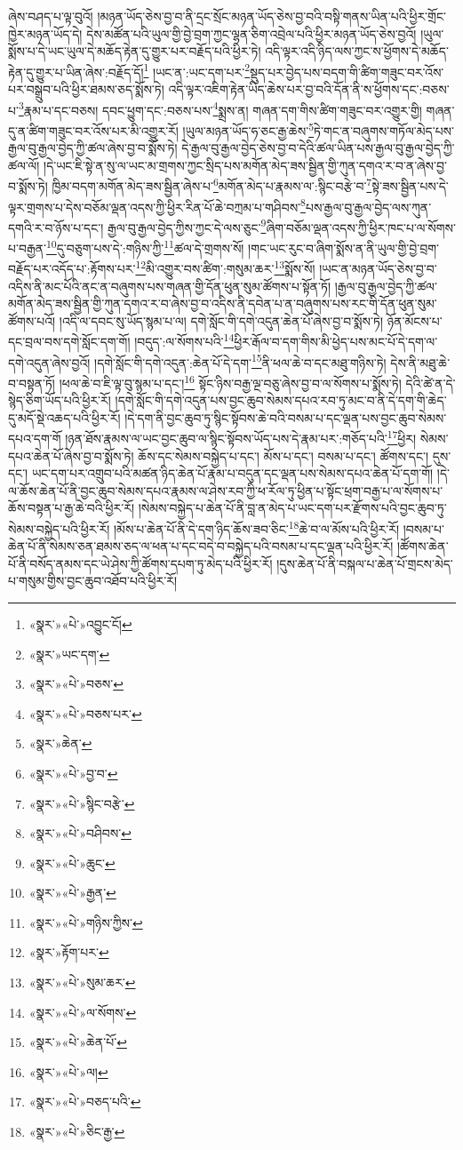ཞེས་བཤད་པ་ལྟ་བུའོ། །མཉན་ཡོད་ཅེས་བྱ་བ་ནི་དྲང་སྲོང་མཉན་ཡོད་ཅེས་བྱ་བའི་བསྟི་གནས་ཡིན་པའི་ཕྱིར་གྲོང་ཁྱེར་མཉན་ཡོད་དེ། དེས་མཚོན་པའི་ཡུལ་གྱི་བྱེ་བྲག་ཀྱང་ལྷན་ཅིག་འབྲེལ་པའི་ཕྱིར་མཉན་ཡོད་ཅེས་བྱའོ། །ཡུལ་སྨོས་པ་དེ་ཡང་ཡུལ་དེ་མཆོད་རྟེན་དུ་གྱུར་པར་བརྗོད་པའི་ཕྱིར་ཏེ། འདི་ལྟར་འདི་ཉིད་ལས་ཀྱང་ས་ཕྱོགས་དེ་མཆོད་རྟེན་དུ་གྱུར་པ་ཡིན་ཞེས་:བརྗོད་དོ།\footnote{«སྣར་»«པེ་»འབྱུང་ངོ།} །ཡང་ན་:ཡང་དག་པར་\footnote{«སྣར་»ཡང་དག་}སྡུད་པར་བྱེད་པས་བདག་གི་ཚིག་གཟུང་བར་འོས་པར་བསྒྲུབ་པའི་ཕྱིར་ཐམས་ཅད་སྨོས་ཏེ། འདི་ལྟར་འཇིག་རྟེན་ཡིད་ཆེས་པར་བྱ་བའི་དོན་ནི་ས་ཕྱོགས་དང་:བཅས་པ་\footnote{«སྣར་»«པེ་»བཅས་}རྣམ་པ་དང་བཅས། དབང་ཕྱུག་དང་:བཅས་པས་\footnote{«སྣར་»«པེ་»བཅས་པར་}སྨྲས་ན། གཞན་དག་གིས་ཚིག་གཟུང་བར་འགྱུར་གྱི། གཞན་དུ་ན་ཚིག་གཟུང་བར་འོས་པར་མི་འགྱུར་རོ། །ཡུལ་མཉན་ཡོད་ཧ་ཅང་རྒྱ་ཆེས་\footnote{«སྣར་»ཆེན་}ཏེ་གང་ན་བཞུགས་གཏོལ་མེད་པས་རྒྱལ་བུ་རྒྱལ་བྱེད་ཀྱི་ཚལ་ཞེས་བྱ་བ་སྨོས་ཏེ། དེ་རྒྱལ་བུ་རྒྱལ་བྱེད་ཅེས་བྱ་བ་དེའི་ཚལ་ཡིན་པས་རྒྱལ་བུ་རྒྱལ་བྱེད་ཀྱི་ཚལ་ལོ། །དེ་ཡང་ཇི་སྟེ་ན་སུ་ལ་ཡང་མ་གྲགས་ཀྱང་སྲིད་པས་མགོན་མེད་ཟས་སྦྱིན་གྱི་ཀུན་དགའ་ར་བ་ན་ཞེས་བྱ་བ་སྨོས་ཏེ། ཁྱིམ་བདག་མགོན་མེད་ཟས་སྦྱིན་ཞེས་པ་\footnote{«སྣར་»«པེ་»བྱ་བ་}མགོན་མེད་པ་རྣམས་ལ་:སྙིང་བརྩེ་བ་\footnote{«སྣར་»«པེ་»སྙིང་བརྩེ་}སྟེ་ཟས་སྦྱིན་པས་དེ་ལྟར་གྲགས་པ་དེས་བཅོམ་ལྡན་འདས་ཀྱི་ཕྱིར་རིན་པོ་ཆེ་བཀྲམ་པ་གཤིབས་\footnote{«སྣར་»«པེ་»བཤིབས་}པས་རྒྱལ་བུ་རྒྱལ་བྱེད་ལས་ཀུན་དགའི་ར་བ་ཉོས་པ་དང་། རྒྱལ་བུ་རྒྱལ་བྱེད་ཀྱིས་ཀྱང་དེ་ལས་ཅུང་\footnote{«སྣར་»«པེ་»ཆུང་}ཞིག་བཅོམ་ལྡན་འདས་ཀྱི་ཕྱིར་ཁང་པ་ལ་སོགས་པ་བརྒྱན་\footnote{«སྣར་»«པེ་»རྒྱན་}དུ་བཅུག་པས་དེ་:གཉིས་ཀྱི་\footnote{«སྣར་»«པེ་»གཉིས་ཀྱིས་}ཚལ་དེ་གྲགས་སོ། །གང་ཡང་རུང་བ་ཞིག་སྨོས་ན་ནི་ཡུལ་གྱི་བྱེ་བྲག་བརྗོད་པར་འདོད་པ་:རྟོགས་པར་\footnote{«སྣར་»རྟོག་པར་}མི་འགྱུར་བས་ཚིག་:གསུམ་ཆར་\footnote{«སྣར་»«པེ་»སུམ་ཆར་}སྨོས་སོ། །ཡང་ན་མཉན་ཡོད་ཅེས་བྱ་བ་འདིས་ནི་མང་པོའི་ནང་ན་བཞུགས་པས་གཞན་གྱི་དོན་ཕུན་སུམ་ཚོགས་པ་སྟོན་ཏོ། །རྒྱལ་བུ་རྒྱལ་བྱེད་ཀྱི་ཚལ་མགོན་མེད་ཟས་སྦྱིན་གྱི་ཀུན་དགའ་ར་བ་ཞེས་བྱ་བ་འདིས་ནི་དབེན་པ་ན་བཞུགས་པས་རང་གི་དོན་ཕུན་སུམ་ཚོགས་པའོ། །འདི་ལ་དབང་སུ་ཡོད་སྙམ་པ་ལ། དགེ་སློང་གི་དགེ་འདུན་ཆེན་པོ་ཞེས་བྱ་བ་སྨོས་ཏེ། ཉོན་མོངས་པ་དང་བྲལ་བས་དགེ་སློང་དག་གོ། །བདུད་:ལ་སོགས་པའི་\footnote{«སྣར་»«པེ་»ལ་སོགས་}ཕྱིར་རྒོལ་བ་དག་གིས་མི་ཕྱེད་པས་མང་པོ་དེ་དག་ལ་དགེ་འདུན་ཞེས་བྱའོ། །དགེ་སློང་གི་དགེ་འདུན་:ཆེན་པོ་དེ་དག་\footnote{«སྣར་»«པེ་»ཆེན་པོ་}ནི་ཕལ་ཆེ་བ་དང་མཐུ་གཉིས་ཏེ། དེས་ནི་མཐུ་ཆེ་བ་བསྟན་ཏོ། །ཕལ་ཆེ་བ་ཇི་ལྟ་བུ་སྙམ་པ་དང་།\footnote{«སྣར་»«པེ་»ལ།} སྟོང་ཉིས་བརྒྱ་ལྔ་བཅུ་ཞེས་བྱ་བ་ལ་སོགས་པ་སྨོས་ཏེ། དེའི་ཚེ་ན་དེ་སྙེད་ཅིག་ཡོད་པའི་ཕྱིར་རོ། །དགེ་སློང་གི་དགེ་འདུན་པས་བྱང་ཆུབ་སེམས་དཔའ་རབ་ཏུ་མང་བ་ནི་དེ་དག་གི་ཆེད་དུ་མདོ་སྡེ་འཆད་པའི་ཕྱིར་རོ། །དེ་དག་ནི་བྱང་ཆུབ་ཏུ་སྙིང་སྟོབས་ཆེ་བའི་བསམ་པ་དང་ལྡན་པས་བྱང་ཆུབ་སེམས་དཔའ་དག་གོ །ཉན་ཐོས་རྣམས་ལ་ཡང་བྱང་ཆུབ་ལ་སྙིང་སྟོབས་ཡོད་པས་དེ་རྣམ་པར་:གཅོད་པའི་\footnote{«སྣར་»«པེ་»བཅད་པའི་}ཕྱིར། སེམས་དཔའ་ཆེན་པོ་ཞེས་བྱ་བ་སྨོས་ཏེ། ཆོས་དང་སེམས་བསྐྱེད་པ་དང་། མོས་པ་དང་། བསམ་པ་དང་། ཚོགས་དང་། དུས་དང་། ཡང་དག་པར་འགྲུབ་པའི་མཚན་ཉིད་ཆེན་པོ་རྣམ་པ་བདུན་དང་ལྡན་པས་སེམས་དཔའ་ཆེན་པོ་དག་གོ། །དེ་ལ་ཆོས་ཆེན་པོ་ནི་བྱང་ཆུབ་སེམས་དཔའ་རྣམས་ལ་ཤེས་རབ་ཀྱི་ཕ་རོལ་ཏུ་ཕྱིན་པ་སྟོང་ཕྲག་བརྒྱ་པ་ལ་སོགས་པ་ཆོས་བསྟན་པ་རྒྱ་ཆེ་བའི་ཕྱིར་རོ། །སེམས་བསྐྱེད་པ་ཆེན་པོ་ནི་བླ་ན་མེད་པ་ཡང་དག་པར་རྫོགས་པའི་བྱང་ཆུབ་ཏུ་སེམས་བསྐྱེད་པའི་ཕྱིར་རོ། །མོས་པ་ཆེན་པོ་ནི་དེ་དག་ཉིད་ཆོས་ཟབ་ཅིང་\footnote{«སྣར་»«པེ་»ཅིང་རྒྱ་}ཆེ་བ་ལ་མོས་པའི་ཕྱིར་རོ། །བསམ་པ་ཆེན་པོ་ནི་སེམས་ཅན་ཐམས་ཅད་ལ་ཕན་པ་དང་བདེ་བ་བསྐྱེད་པའི་བསམ་པ་དང་ལྡན་པའི་ཕྱིར་རོ། །ཚོགས་ཆེན་པོ་ནི་བསོད་ནམས་དང་ཡེ་ཤེས་ཀྱི་ཚོགས་དཔག་ཏུ་མེད་པའི་ཕྱིར་རོ། །དུས་ཆེན་པོ་ནི་བསྐལ་པ་ཆེན་པོ་གྲངས་མེད་པ་གསུམ་གྱིས་བྱང་ཆུབ་འཐོབ་པའི་ཕྱིར་རོ། 